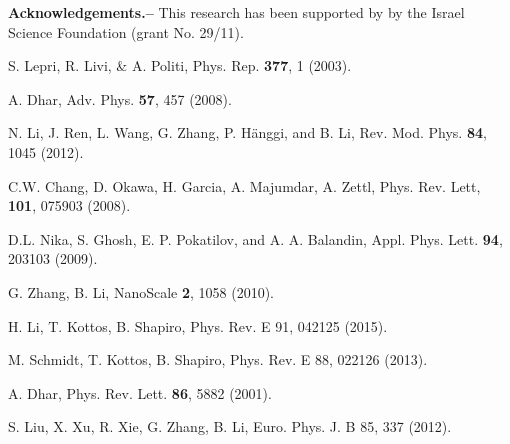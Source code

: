 \documentclass[twocolumn,showpacs,aps,pre]{revtex4-1}
\begin{document}

\noindent
{\bf Acknowledgements.-- }
This research has been supported by  by the Israel Science Foundation (grant No. 29/11).



\begin{thebibliography}{99}

S. Lepri, R. Livi, \& A. Politi, 
Phys. Rep. {\bf 377}, 1 (2003).

A. Dhar, 
Adv. Phys. {\bf 57}, 457 (2008).

N. Li, J. Ren, L. Wang, G. Zhang, P. H\"anggi, and B. Li, 
Rev. Mod. Phys. \textbf{84}, 1045 (2012).


C.W. Chang, D. Okawa, H. Garcia, A. Majumdar,  A. Zettl, 
Phys. Rev. Lett, {\bf 101}, 075903 (2008).

D.L. Nika, S. Ghosh, E. P. Pokatilov, and A. A. Balandin, 
Appl. Phys. Lett. {\bf 94}, 203103 (2009).


G. Zhang, B. Li,
NanoScale {\bf 2}, 1058 (2010).

H. Li, T. Kottos, B. Shapiro, 
Phys. Rev. E  91, 042125 (2015).

M. Schmidt, T. Kottos, B. Shapiro,
Phys. Rev. E  88, 022126 (2013).

A. Dhar, 
Phys. Rev. Lett. {\bf 86}, 5882 (2001).

S. Liu, X. Xu, R. Xie, G. Zhang, B. Li, 
Euro. Phys. J. B 85, 337 (2012).


\end{thebibliography}
\end{document}
